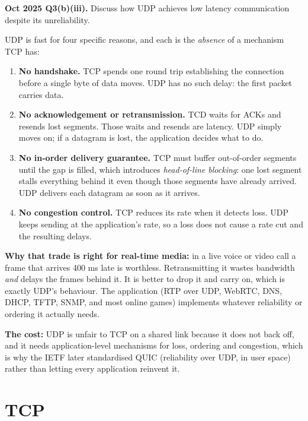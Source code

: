 \documentclass[11pt,a4paper]{article}
\begin{document}
\begin{pyqbox}
\textbf{Oct 2025 Q3(b)(iii).} Discuss how UDP achieves low latency communication despite its unreliability.
\end{pyqbox}

\begin{solbox}
UDP is fast for four specific reasons, and each is the \emph{absence} of a mechanism TCP has:

\begin{enumerate}
\item \textbf{No handshake.} TCP spends one round trip establishing the connection before a single byte of data moves. UDP has no such delay: the first packet carries data.
\item \textbf{No acknowledgement or retransmission.} TCD waits for ACKs and resends lost segments. Those waits and resends are latency. UDP simply moves on; if a datagram is lost, the application decides what to do.
\item \textbf{No in-order delivery guarantee.} TCP must buffer out-of-order segments until the gap is filled, which introduces \emph{head-of-line blocking}: one lost segment stalls everything behind it even though those segments have already arrived. UDP delivers each datagram as soon as it arrives.
\item \textbf{No congestion control.} TCP reduces its rate when it detects loss. UDP keeps sending at the application's rate, so a loss does not cause a rate cut and the resulting delays.
\end{enumerate}

\textbf{Why that trade is right for real-time media:} in a live voice or video call a frame that arrives 400 ms late is worthless. Retransmitting it wastes bandwidth \emph{and} delays the frames behind it. It is better to drop it and carry on, which is exactly UDP's behaviour. The application (RTP over UDP, WebRTC, DNS, DHCP, TFTP, SNMP, and most online games) implements whatever reliability or ordering it actually needs.

\textbf{The cost:} UDP is unfair to TCP on a shared link because it does not back off, and it needs application-level mechanisms for loss, ordering and congestion, which is why the IETF later standardised QUIC (reliability over UDP, in user space) rather than letting every application reinvent it.
\end{solbox}

\section{TCP}
\end{document}
